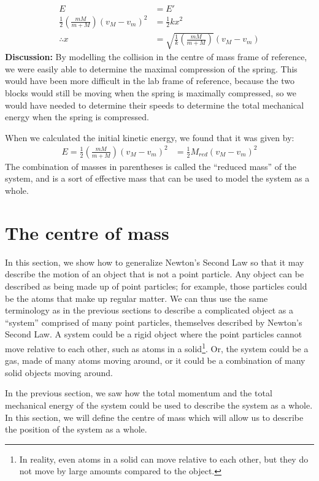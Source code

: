 \begin{example}
\begin{align*}
E &= E' \\
\frac{1}{2} \left(\frac{mM}{m+M}\right)(v_M-v_m)^2 &= \frac{1}{2}kx^2\\
\therefore x &= \sqrt{\frac{1}{k} \left(\frac{mM}{m+M}\right)}(v_M-v_m)
\end{align*}
\textbf{Discussion:} By modelling the collision in the centre of mass frame of reference, we were easily able to determine the maximal compression of the spring. This would have been more difficult in the lab frame of reference, because the two blocks would still be moving when the spring is maximally compressed, so we would have needed to determine their speeds to determine the total mechanical energy when the spring is compressed.

When we calculated the initial kinetic energy, we found that it was given by:
\begin{align*}
E=\frac{1}{2} \left(\frac{mM}{m+M}\right)(v_M-v_m)^2 &=\frac{1}{2}M_{red}(v_M-v_m)^2
\end{align*}
The combination of masses in parentheses is called the ``reduced mass'' of the system, and is a sort of effective mass that can be used to model the system as a whole. 
\end{example}

\section{The centre of mass}
In this section, we show how to generalize Newton's Second Law so that it may describe the motion of an object that is not a point particle. Any object can be described as being made up of point particles; for example, those particles could be the atoms that make up regular matter. We can thus use the same terminology as in the previous sections to describe a complicated object as a ``system'' comprised of many point particles, themselves described by Newton's Second Law. A system could be a rigid object where the point particles cannot move relative to each other, such as atoms in a solid\footnote{In reality, even atoms in a solid can move relative to each other, but they do not move by large amounts compared to the object.}. Or, the system could be a gas, made of many atoms moving around, or it could be a combination of many solid objects moving around. 

In the previous section, we saw how the total momentum and the total mechanical energy of the system could be used to describe the system as a whole. In this section, we will define the centre of mass which will allow us to describe the position of the system as a whole.

